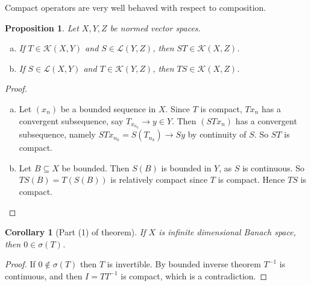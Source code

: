 \documentclass[10pt, oneside, reqno]{amsart}
\theoremstyle{plain}%
\newtheorem{prop}[thm]{Proposition}
\newtheorem*{cor}{Corollary}
\theoremstyle{definition}
\theoremstyle{remark}
\begin{document}
Compact operators are very well behaved with respect to composition.  
\begin{prop}
    Let $X, Y, Z$ be normed vector spaces.  
    \begin{enumerate}[(a)]
        \item If $T \in \mathcal K(X, Y)$ and $S \in \mathcal L(Y, Z)$, then $
            ST \in \mathcal K(X, Z)
        $.
        \item If $S \in \mathcal L(X, Y)$ and $T \in \mathcal K(Y, Z)$, then $
            TS \in \mathcal K(X, Z)
        $.
    \end{enumerate}
\end{prop}
\begin{proof}
    \begin{enumerate}[(a)]
        \item Let $(x_n)$ be a bounded sequence in $X$.  Since $T$ is compact, $Tx_n$ has a convergent subsequence, say $T_{x_{n_k}} \rightarrow y \in Y$. Then $(STx_n)$ has a convergent subsequence, namely $STx_{n_k} = S(T_{n_k}) \rightarrow Sy$  by continuity of $S$.  So $ST$ is compact. 
        \item Let $B \subseteq X$ be bounded.  Then $S(B)$ is bounded in $Y$, as $S$ is continuous.  So $TS(B) = T(S(B))$ is relatively compact since $T$ is compact. Hence $TS$ is compact.
    \end{enumerate}
\end{proof}

\begin{cor}[Part (1) of theorem]
    If $X$ is infinite dimensional Banach space, then $0 \in \sigma(T)$.  
\end{cor}
\begin{proof}
    If $0 \notin \sigma(T)$ then $T$ is invertible.  By bounded inverse theorem $T^{-1}$ is continuous, and then $I = T T^{-1}$ is compact, which is a contradiction.
\end{proof}
\end{document}
